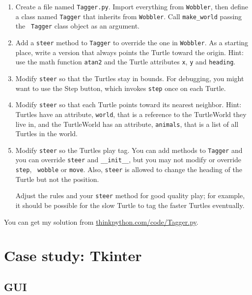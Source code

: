 \documentclass[10pt]{book}
\begin{document}
{\begin{ex}
\begin{enumerate}

\item Create a file named {\tt Tagger.py}.  Import everything from
  {\tt Wobbler}, then define a class named {\tt Tagger} that inherits
  from {\tt Wobbler}.  Call \verb"make_world" passing the {\tt
    Tagger} class object as an argument.

\item Add a {\tt steer} method to {\tt Tagger} to override the one in
  {\tt Wobbler}.  As a starting place, write a version that always
  points the Turtle toward the origin.  Hint: use the math function
  {\tt atan2} and the Turtle attributes {\tt x}, {\tt y} and
  {\tt heading}.

\item Modify {\tt steer} so that the Turtles stay in bounds.
  For debugging, you might want to use the {\sf Step} button,
  which invokes {\tt step} once on each Turtle.

\item Modify {\tt steer} so that each Turtle points toward its nearest
  neighbor.  Hint: Turtles have an attribute, {\tt world}, that is a
  reference to the TurtleWorld they live in, and the TurtleWorld has
  an attribute, {\tt animals}, that is a list of all Turtles in the
  world.

\item Modify {\tt steer} so the Turtles play tag.  You can add methods
  to {\tt Tagger} and you can override {\tt steer} and
  \verb"__init__", but you may not modify or override {\tt step}, {\tt
    wobble} or {\tt move}.  Also, {\tt steer} is allowed to change the
  heading of the Turtle but not the position.

Adjust the rules and your {\tt steer} method for good quality play;
for example, it should be possible for the slow Turtle to tag the
faster Turtles eventually.

\end{enumerate}

You can get my solution from \url{thinkpython.com/code/Tagger.py}.
\end{ex}



\chapter{Case study: Tkinter}

\section{GUI}

}
\end{document}
